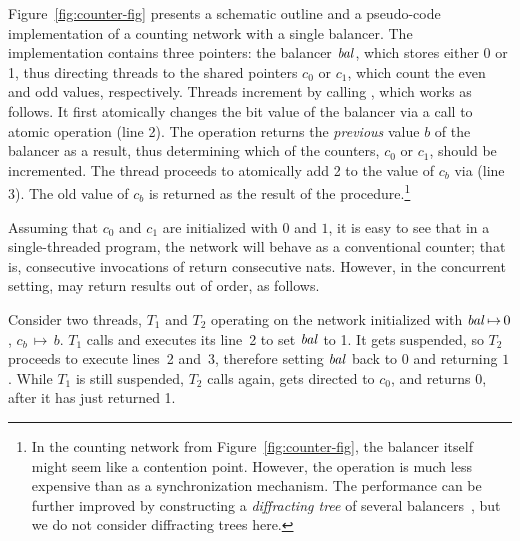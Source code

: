 Figure~\ref{fig:counter-fig} presents a schematic outline and a
pseudo-code implementation of a counting network with a single
balancer.
%
The implementation contains three pointers: the balancer $\mathit{bal}$, which
stores either 0 or 1, thus directing threads to the shared pointers
$c_0$ or $c_1$, which count the even and odd values,
respectively. Threads increment by calling , which
works as follows. It first atomically changes the bit value of the
balancer via a call to atomic operation  (line 2). The
 operation returns the \emph{previous} value $b$ of the
balancer as a result, thus determining which of the counters, $c_0$ or
$c_1$, should be incremented. The thread proceeds to atomically add 2
to the value of $c_b$ via  (line 3). The old value
of $c_b$ is returned as the result of the procedure.\footnote{In the
  counting network from Figure~\ref{fig:counter-fig}, the balancer
  itself might seem like a contention point. However, the 
  operation is much less expensive than  as a
  synchronization mechanism. The performance can be further improved
  by constructing a \emph{diffracting tree} of several
  balancers~\cite[\S 12.6]{Herlihy-Shavit:08}, but we do not consider
  diffracting trees here.}


Assuming that $c_0$ and $c_1$ are initialized with $0$ and $1$, it is
easy to see that in a single-threaded program, the network will behave
as a conventional counter; that is, consecutive invocations of
 return consecutive nats.
%
However, in the concurrent setting,  may return
results out of order, as follows. 
%

\vspace{3pt}
\begin{example}
\label{ex:t1t2}
%
Consider two threads, $T_1$ and $T_2$ operating on the network
initialized with $\mathit{bal}\,{\mapsto}\,0$, $c_b\,{\mapsto}\,b$. $T_1$
calls  and executes its line~2 to set $\mathit{bal}$ to 1. It
gets suspended, so $T_2$ proceeds to execute lines~2 and~3, therefore
setting $\mathit{bal}$ back to $0$ and returning $1$. While $T_1$ is still
suspended, $T_2$ calls  again, gets directed to $c_0$,
and returns 0, after it has just returned 1.
%
\end{example}
\vspace{3pt}

